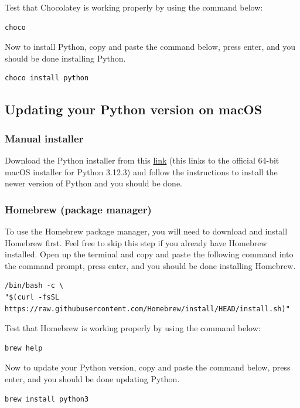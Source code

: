 \documentclass[11pt]{article}
\begin{document}
Test that Chocolatey is working properly by using the command below:
\begin{verbatim}
choco
\end{verbatim}

Now to install Python, copy and paste the command below, press enter, and you should be done installing Python.
\begin{verbatim}
choco install python
\end{verbatim}

 \newpage

\subsection{Updating your Python version on macOS}
\label{sec:orga759555}

\subsubsection{Manual installer}
\label{sec:org6582262}
Download the Python installer from this \href{https://www.python.org/ftp/python/3.12.3/python-3.12.3-macos11.pkg}{link} (this links to the official 64-bit macOS installer for Python 3.12.3) and follow the instructions to install the newer version of Python and you should be done.

\subsubsection{Homebrew (package manager)}
\label{sec:org55441b7}
To use the Homebrew package manager, you will need to download and install Homebrew first. Feel free to skip this step if you already have Homebrew installed. Open up the terminal and copy and paste the following command into the command prompt, press enter, and you should be done installing Homebrew.
\begin{verbatim}
/bin/bash -c \
"$(curl -fsSL https://raw.githubusercontent.com/Homebrew/install/HEAD/install.sh)"
\end{verbatim}

Test that Homebrew is working properly by using the command below:
\begin{verbatim}
brew help
\end{verbatim}

Now to update your Python version, copy and paste the command below, press enter, and you should be done updating Python.
\begin{verbatim}
brew install python3
\end{verbatim}
\end{document}
